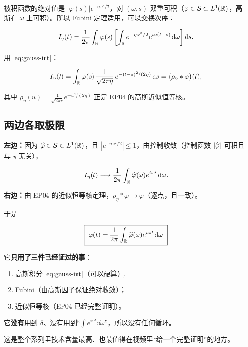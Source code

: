 被积函数的绝对值是 $|\varphi(s)|e^{-\eta\omega^{2}/2}$，对 $(\omega,s)$ 双重可积（$\varphi\in\mathcal{S}\subset L^1(\mathbb{R})$，高斯在 $\omega$ 上可积）。所以 Fubini 定理适用，可以交换次序：

\begin{equation}
I_\eta(t)=\frac{1}{2\pi}\int_{\mathbb{R}}\varphi(s)\left[\int_{\mathbb{R}}e^{-\eta\omega^{2}/2}e^{i\omega(t-s)}\mathop{}\!\mathrm{d}\omega\right]\mathop{}\!\mathrm{d} s .
\end{equation}

用 \eqref{eq:gauss-int}：

\begin{equation}
I_\eta(t)=\int_{\mathbb{R}}\varphi(s)\,\frac{1}{\sqrt{2\pi\eta}}\,e^{-(t-s)^{2}/(2\eta)}\mathop{}\!\mathrm{d} s
=\big(\rho_\eta*\varphi\big)(t),\label{eq:conv-gauss}
\end{equation}

其中 $\rho_\eta(u)=\frac{1}{\sqrt{2\pi\eta}}e^{-u^{2}/(2\eta)}$ 正是 EP04 的高斯近似恒等核。

\subsection{两边各取极限}

\textbf{左边：}因为 $\widehat{\varphi}\in\mathcal{S}\subset L^1(\mathbb{R})$，且 $|e^{-\eta\omega^{2}/2}|\le1$，由控制收敛（控制函数 $|\widehat{\varphi}|$ 可积且与 $\eta$ 无关），

\begin{equation}
I_\eta(t)\longrightarrow\frac{1}{2\pi}\int_{\mathbb{R}}\widehat{\varphi}(\omega)e^{i\omega t}\mathop{}\!\mathrm{d}\omega .
\end{equation}

\textbf{右边：}由 EP04 的近似恒等核定理，$\rho_\eta*\varphi\to\varphi$（逐点，且一致）。

于是

\begin{equation}
\boxed{\ \varphi(t)=\frac{1}{2\pi}\int_{\R}\ph(\omega)e^{i\omega t}\dd\omega\ }\label{eq:inversion}
\end{equation}

\begin{ideabox}[这个证明漂亮在哪里]
它\textbf{只用了三件已经证过的事}：
\begin{enumerate}[leftmargin=1.4em,itemsep=0.2em]
\item 高斯积分 \eqref{eq:gauss-int}（可以硬算）；
\item Fubini（由高斯因子保证绝对收敛）；
\item 近似恒等核（EP04 已经完整证明）。
\end{enumerate}

它\textbf{没有}用到 $\delta$、没有用到“$\int e^{i\omega t}\dd\omega$”，所以没有任何循环。

这是整个系列里技术含量最高、也最值得在视频里“给一个完整证明”的地方。
\end{ideabox}

